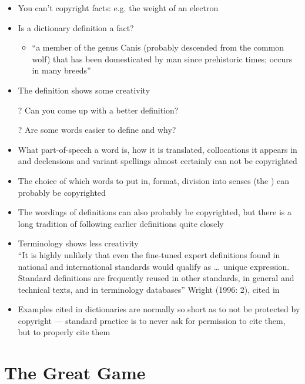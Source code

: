 \documentclass[a4paper,landscape,headrule,footrule,xetex]{foils}
\begin{document}
\begin{itemize}\addtolength{\itemsep}{-1ex}
\item You can't copyright facts: e.g. the weight of an electron
\item Is a dictionary definition a fact?
  \begin{itemize}
  \item {} ``a member of the genus Canis (probably descended
    from the common wolf) that has been domesticated by man since
    prehistoric times; occurs in many breeds''
  \end{itemize}
\item The definition shows some creativity
\item[?] Can you come up with a better definition? \task 
\item[?] Are some words easier to define and why? \task 


\newpage
\item What part-of-speech a word is, how it is translated,
  collocations it appears in and declensions and variant spellings 
  almost certainly can not be copyrighted

\item The choice of which words to put in, format, division into senses (the ) can probably be copyrighted
\item The wordings of definitions can also probably be copyrighted,
  but there is a long tradition of following earlier definitions quite closely
\item Terminology shows less creativity
\\
``It is highly unlikely that even the fine-tuned expert
  definitions found in national and international standards would
  qualify as \ldots\ unique expression.  Standard definitions are
  frequently reused in other standards, in general and technical
  texts, and in terminology databases'' Wright (1996: 2), cited in
  \citet{Alberts:Jooste:2012}
\item Examples cited in dictionaries are normally so short as to not
  be protected by copyright --- standard practice is to never ask for permission to cite them, but to properly cite them \citep{Landau:1989}
\end{itemize}

\section{The Great Game}
\end{document}
